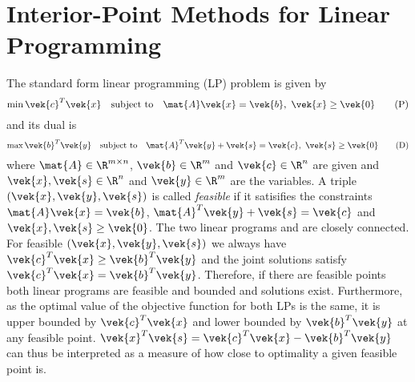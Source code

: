 \chapter{Interior-Point Methods for Linear Programming}\label{chap:ipm}



The standard form linear programming (LP) problem is given by
\begin{equation}\label{eqn:primal-lp}
 \min \vek{c}^T \vek{x} \quad \text{subject to} \quad \mat{A}\vek{x} = \vek{b}, \ \vek{x} \geq \vek{0} \tag{P}
\end{equation}
and its dual is
\begin{equation}\label{eqn:dual-lp}
  \max \vek{b}^T \vek{y} \quad \text{subject to} \quad \mat{A}^T \vek{y} + \vek{s} = \vek{c}, \ \vek{s} \geq \vek{0} \tag{D}
\end{equation}
where \(\mat{A} \in \R^{m \times n}\), \(\vek{b} \in \R^m\) and \(\vek{c} \in \R^n\) are given and \(\vek{x}, \vek{s} \in \R^n\) and \(\vek{y} \in \R^m\) are the variables.
A triple \((\vek{x}, \vek{y}, \vek{s})\) is called \emph{feasible} if it satisifies the constraints \(\mat{A}\vek{x} = \vek{b}\), \(\mat{A}^T \vek{y} + \vek{s} = \vek{c}\) and \(\vek{x}, \vek{s} \geq \vek{0}\).
The two linear programs  and  are closely connected.
For feasible \((\vek{x}, \vek{y}, \vek{s})\) we always have \(\vek{c}^T \vek{x} \geq \vek{b}^T \vek{y}\) and the joint solutions satisfy \(\vek{c}^T \vek{x} = \vek{b}^T \vek{y}\).
Therefore, if there are feasible points both linear programs are feasible and bounded and solutions exist.
Furthermore, as the optimal value of the objective function for both LPs is the same, it is upper bounded by \(\vek{c}^T \vek{x}\) and lower bounded by \(\vek{b}^T \vek{y}\) at any feasible point.
\(\vek{x}^T \vek{s} = \vek{c}^T \vek{x} - \vek{b}^T \vek{y}\) can thus be interpreted as a measure of how close to optimality a given feasible point is.

